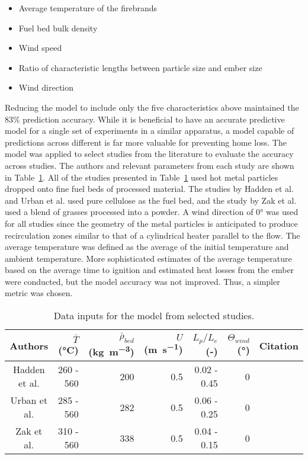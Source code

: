         \begin{itemize}
            \item Average temperature of the firebrands
            \item Fuel bed bulk density
            \item Wind speed
            \item Ratio of characteristic lengths between particle size and ember size
            \item Wind direction
        \end{itemize}
    Reducing the model to include only the five characteristics above maintained the 83\% prediction accuracy. While it is beneficial to have an accurate predictive model for a single set of experiments in a similar apparatus, a model capable of predictions across different is far more valuable for preventing home loss. The model was applied to select studies from the literature to evaluate the accuracy across studies. The authors and relevant parameters from each study are shown in Table~\ref{tab:otherStudies}. All of the studies presented in Table~\ref{tab:otherStudies} used hot metal particles dropped onto fine fuel beds of processed material. The studies by Hadden et al. and Urban et al. used pure cellulose as the fuel bed, and the study by Zak et al. used a blend of grasses processed into a powder. A wind direction of 0\si{\degree} was used for all studies since the geometry of the metal particles is anticipated to produce recirculation zones similar to that of a cylindrical heater parallel to the flow. The average temperature was defined as the average of the initial temperature and ambient temperature. More sophisticated estimates of the average temperature based on the average time to ignition and estimated heat losses from the ember were conducted, but the model accuracy was not improved. Thus, a simpler metric was chosen.  
        \begin{table}[hbpt]
            \centering
            \caption{Data inputs for the model from selected studies.}
            \begin{tabular}{crrrrrc}
                Authors & $\bar{T}$ (\si{\celsius}) &  $\bar{\rho}_{bed}$ (\si{\kilo\gram\per\cubic\meter})& $U$ (\si{\meter\per\second}) & $L_{p}/L_{e}$ (-)& $\Theta_{wind}$ (\si{\degree}) & Citation\\
                \hline
                 Hadden et al. & 260 - 560 & 200 & 0.5 & 0.02 - 0.45 & 0 & \cite{Hadden2011}\\
                 Urban et al. & 285 - 560 & 282 & 0.5 & 0.06 - 0.25 & 0 & \cite{Urban2018}\\
                 Zak et al.    & 310 - 560 & 338 & 0.5 & 0.04 - 0.15 & 0 & \cite{Zak2014}
            \end{tabular}
            \label{tab:otherStudies}
        \end{table}

